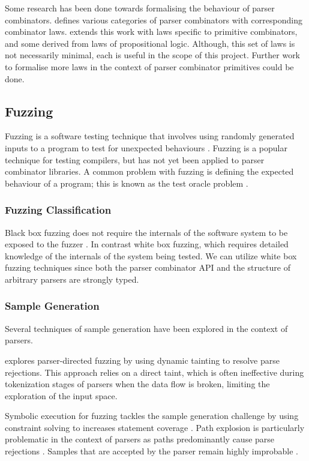 \documentclass[11pt]{article}
\let\oldciteauthor\citeauthor
\renewcommand{\citeauthor}[1]{\oldciteauthor{#1} \cite{#1}}
\begin{document}
Some research has been done towards formalising the behaviour of parser combinators. \citeauthor{parsley} defines various categories of parser combinators with corresponding combinator laws. \citeauthor{staged-selective} extends this work with laws specific to primitive combinators, and some derived from laws of propositional logic. Although, this set of laws is not necessarily minimal, each is useful in the scope of this project. Further work to formalise more laws in the context of parser combinator primitives could be done.

\subsection{Fuzzing}
Fuzzing is a software testing technique that involves using randomly generated inputs to a program to test for unexpected behaviours \cite{fuzzing-importance}. Fuzzing is a popular technique for testing compilers, but has not yet been applied to parser combinator libraries. A common problem with fuzzing is defining the expected behaviour of a program; this is known as the test oracle problem \cite{fuzzing}.

\subsubsection{Fuzzing Classification}
Black box fuzzing does not require the internals of the software system to be exposed to the fuzzer \cite{fuzzing}. In contrast white box fuzzing, which requires detailed knowledge of the internals of the system being tested. We can utilize white box fuzzing techniques since both the parser combinator API and the structure of arbitrary parsers are strongly typed.

\subsubsection{Sample Generation}
Several techniques of sample generation have been explored in the context of parsers. 

\citeauthor{parser-directed} explores parser-directed fuzzing by using dynamic tainting to resolve parse rejections. This approach relies on a direct taint, which is often ineffective during tokenization stages of parsers when the data flow is broken, limiting the exploration of the input space.

Symbolic execution for fuzzing tackles the sample generation challenge by using constraint solving to increases statement coverage \cite{klee}. Path explosion is particularly problematic in the context of parsers as paths predominantly cause parse rejections \cite{path-explosion}. Samples that are accepted by the parser remain highly improbable \cite{parser-directed}.
\end{document}
